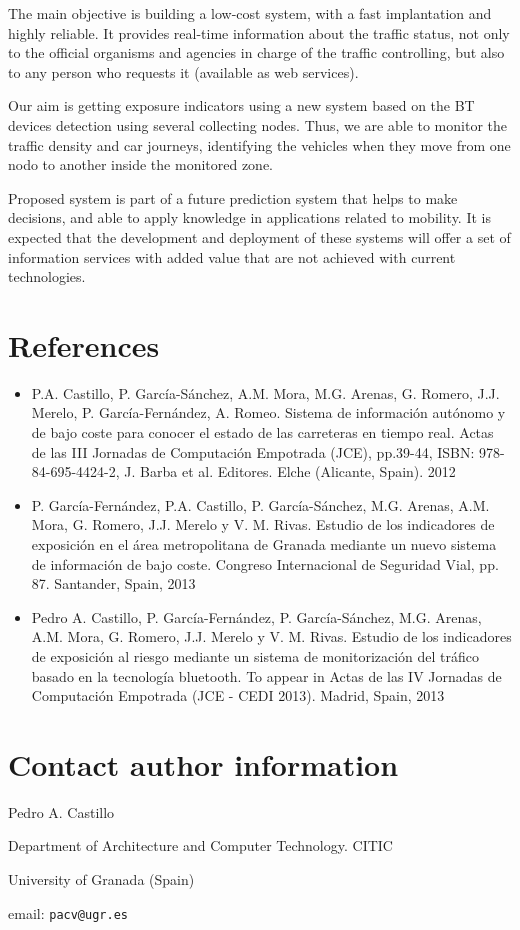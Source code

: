 \documentclass{llncs}
\begin{document}
The main objective is building a low-cost system, with a fast implantation and highly reliable. 
It provides real-time information about the traffic status, not only to the official organisms and agencies in charge of the traffic controlling, but also to any person who requests it (available as web services).

Our aim is getting exposure indicators using a new system based on the BT devices detection using several collecting nodes. Thus, we are able to monitor the traffic density and car journeys, identifying the vehicles when they move from one nodo to another inside the monitored zone.

Proposed system is part of a future prediction system that helps to make decisions, and able to apply knowledge in applications related to mobility. It is expected that the development and deployment of these systems will offer a set of information services with added value that are not achieved with current technologies.



\section{References}

\begin{itemize}

 \item P.A. Castillo, P. García-Sánchez, A.M. Mora, M.G. Arenas, G. Romero, J.J. Merelo, P. García-Fernández, A. Romeo. Sistema de información autónomo y de bajo coste para conocer el estado de las carreteras en tiempo real. Actas de las III Jornadas de Computación Empotrada (JCE), pp.39-44, ISBN: 978-84-695-4424-2, J. Barba et al. Editores. Elche (Alicante, Spain). 2012
 
 \item P. García-Fernández, P.A. Castillo, P. García-Sánchez, M.G. Arenas, A.M. Mora, G. Romero, J.J. Merelo y V. M. Rivas. Estudio de los indicadores de exposición en el área metropolitana de Granada mediante un nuevo sistema de información de bajo coste. Congreso Internacional de Seguridad Vial, pp. 87. Santander, Spain, 2013

 \item Pedro A. Castillo, P. García-Fernández, P. García-Sánchez, M.G. Arenas, A.M. Mora, G. Romero, J.J. Merelo y V. M. Rivas. Estudio de los indicadores de exposición al riesgo mediante un sistema de monitorización del tráfico basado en la tecnología bluetooth. To appear in Actas de las IV Jornadas de Computación Empotrada (JCE - CEDI 2013). Madrid, Spain, 2013

\end{itemize}

\section{Contact author information}

Pedro A. Castillo

Department of Architecture and Computer Technology. CITIC

University of Granada (Spain)

email: {\tt pacv@ugr.es}
\end{document}
